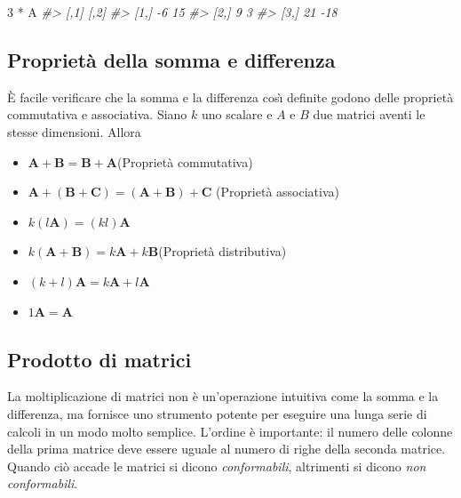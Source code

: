 \documentclass[
  11pt,
]{krantz}
\makeatletter
\newenvironment{Shaded}{\begin{snugshade}}{\end{snugshade}}
\newcommand{\CommentTok}[1]{\textcolor[rgb]{0.37,0.37,0.37}{\textit{#1}}}
\newcommand{\DecValTok}[1]{\textcolor[rgb]{0.06,0.06,0.06}{#1}}
\newcommand{\NormalTok}[1]{#1}
\newcommand{\SpecialCharTok}[1]{\textcolor[rgb]{0,0,0}{#1}}
\providecommand{\tightlist}{%
  \setlength{\itemsep}{0pt}\setlength{\parskip}{0pt}}
\newenvironment{kframe}{%
\medskip{}
\setlength{\fboxsep}{.8em}
 \def\at@end@of@kframe{}%
 \ifinner\ifhmode%
  \def\at@end@of@kframe{\end{minipage}}%
  \begin{minipage}{\columnwidth}%
 \fi\fi%
 \def\FrameCommand##1{\hskip\@totalleftmargin \hskip-\fboxsep
 \colorbox{shadecolor}{##1}\hskip-\fboxsep
     \hskip-\linewidth \hskip-\@totalleftmargin \hskip\columnwidth}%
 \MakeFramed {\advance\hsize-\width
   \@totalleftmargin\z@ \linewidth\hsize
   \@setminipage}}%
 {\par\unskip\endMakeFramed%
 \at@end@of@kframe}
\renewenvironment{Shaded}{\begin{kframe}}{\end{kframe}}
\theoremstyle{definition}
\theoremstyle{definition}
\theoremstyle{definition}
\theoremstyle{definition}
\theoremstyle{remark}
\makeatother
\begin{document}
\begin{Shaded}
\begin{Highlighting}[]
\DecValTok{3} \SpecialCharTok{*}\NormalTok{ A}
\CommentTok{\#\textgreater{}      [,1] [,2]}
\CommentTok{\#\textgreater{} [1,]   {-}6   15}
\CommentTok{\#\textgreater{} [2,]    9    3}
\CommentTok{\#\textgreater{} [3,]   21  {-}18}
\end{Highlighting}
\end{Shaded}

\hypertarget{proprietuxe0-della-somma-e-differenza}{%
\subsection{Proprietà della somma e differenza}\label{proprietuxe0-della-somma-e-differenza}}

È facile verificare che la somma e la differenza cosı̀ definite godono delle proprietà commutativa e associativa. Siano \(k\) uno scalare e \(A\) e \(B\) due matrici aventi le stesse dimensioni. Allora

\begin{itemize}
\tightlist
\item
  \(\boldsymbol{A}+ \boldsymbol{B} = \boldsymbol{B} + \boldsymbol{A}\)(Proprietà commutativa)
\item
  \(\boldsymbol{A} + (\boldsymbol{B} + \boldsymbol{C}) = (\boldsymbol{A} + \boldsymbol{B}) + \boldsymbol{C}\) (Proprietà associativa)
\item
  \(k(l\boldsymbol{A}) = (kl)\boldsymbol{A}\)
\item
  \(k(\boldsymbol{A} + \boldsymbol{B}) = k\boldsymbol{A} + k\boldsymbol{B}\)(Proprietà distributiva)
\item
  \((k+l)\boldsymbol{A} = k\boldsymbol{A} + l\boldsymbol{A}\)
\item
  \(1\boldsymbol{A} = \boldsymbol{A}\)
\end{itemize}

\hypertarget{prodotto-di-matrici}{%
\subsection{Prodotto di matrici}\label{prodotto-di-matrici}}

La moltiplicazione di matrici non è un'operazione intuitiva come la somma e la differenza, ma fornisce uno strumento potente per eseguire una lunga serie di calcoli in un modo molto semplice. L'ordine è importante: il numero delle colonne della prima matrice deve essere uguale al numero di righe della seconda matrice. Quando ciò accade le matrici si dicono \emph{conformabili}, altrimenti si dicono \emph{non conformabili}.
\end{document}
